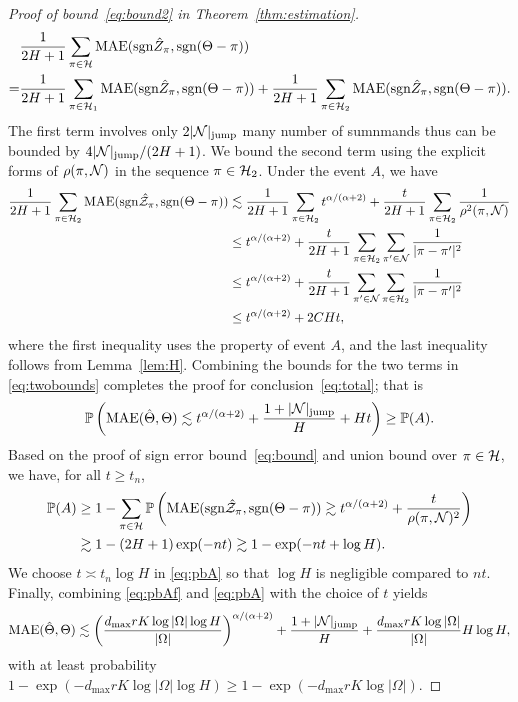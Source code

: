\documentclass[twoside,11pt]{article}
\theoremstyle{definition}
\def\sign{\textup{sgn}}
\begin{document}
\begin{proof}[Proof of bound~\eqref{eq:bound2} in Theorem~\ref{thm:estimation}]
\begin{align}
&{1\over 2H+1}\sum_{\pi \in \tH} \textup{MAE}(\sign \hat Z_\pi, \sign (\Theta-\pi))\notag \\
=&{1\over 2H+1}\sum_{\pi \in\tH_1} \textup{MAE}(\sign \hat Z_\pi, \sign (\Theta-\pi))+{1\over 2H+1}\sum_{\pi \in  \tH_2} \textup{MAE}(\sign \hat Z_\pi, \sign (\Theta-\pi)).
\end{align}
The first term involves only $2|\mathcal{N}|_{\text{jump}}$ many number of sumnmands thus can be bounded by $4|\mathcal{N}|_{\text{jump}}/(2H+1)$.
 We bound the second term using the explicit forms of $\rho(\pi, \mathcal{N})$ in the sequence $\pi \in\mathcal{H}_2$. Under the event $A$, we have  
\begin{align}
{1\over 2H+1}\sum_{\pi \in \tH_2} \textup{MAE}(\sign \hat \tZ_\pi, \sign (\Theta-\pi)) &\lesssim  {1\over 2H+1}\sum_{\pi\in \tH_2} t^{\alpha/(\alpha+2)}+{t\over 2H+1}\sum_{\pi \in \tH_2}{1\over \rho^2(\pi, \tN)}\\
&\leq t^{\alpha/(\alpha+2)}+{t\over 2H+1} \sum_{\pi \in\tH_2} \sum_{\pi' \in \tN}{1\over |\pi-\pi'|^2}\\
&\leq  t^{\alpha/(\alpha+2)}+{t\over 2H+1} \sum_{\pi'\in \tN} \sum_{\pi \in \tH_2}{1\over |\pi-\pi'|^2}\\
&\leq t^{\alpha/(\alpha+2)}+ 2CHt,
\end{align}
where the first inequality uses the property of event $A$, and the last inequality follows from Lemma~\ref{lem:H}.  Combining the bounds for the two terms in \eqref{eq:twobounds} completes the proof for conclusion~\eqref{eq:total}; that is 
\begin{align}\label{eq:pbAf}
\mathbb{P	}\left(\text{MAE}(\hat\Theta,\Theta)\lesssim t^{\alpha/(\alpha+2)}+\frac{1+|\mathcal{N}|_{\text{jump}}}{H}+Ht\right)\geq \mathbb{P}(A).
\end{align} 
Based on the proof of sign error bound~\eqref{eq:bound} and union bound over $\pi\in\mathcal{H}$, we have, for all $t\geq t_n$,
\begin{align}\label{eq:pbA}
\mathbb{P}(A)&\geq 1-\sum_{\pi\in\tH} \mathbb{P}\left(\text{MAE}(\sign\hat \tZ_\pi,\sign(\Theta-\pi))\gtrsim t^{\alpha/(\alpha+2)}+\frac{t}{\rho(\pi,\tN)^2}\right)\nonumber\\
&\gtrsim 1-(2H+1)\exp(-nt)\gtrsim 1-\exp(-nt+\log H).
\end{align}
We choose $t\asymp t_n\log H$ in \eqref{eq:pbA} so that $\log H$ is negligible compared to $nt$.
Finally, combining \eqref{eq:pbAf} and \eqref{eq:pbA} with the choice of $t$  yields
\begin{align}
\text{MAE}(\hat\Theta,\Theta)\lesssim \left(d_{\max}rK\log |\Omega|\log H\over |\Omega|\right)^{\alpha/(\alpha+2)}+\frac{1+|\mathcal{N}|_{\text{jump}}}{H}+{d_{\max}rK\log |\Omega|\over |\Omega|}H\log H,
 \end{align}
 with at least probability $1-\exp(-d_{\max}rK\log|\Omega|\log H)\geq 1-\exp(-d_{\max}rK\log|\Omega|)$.

\end{proof}
\end{document}
